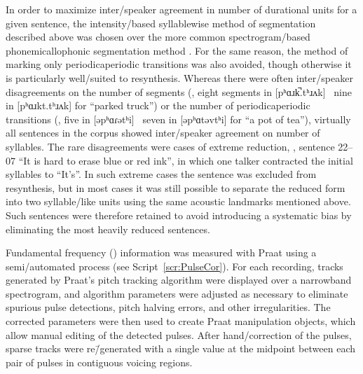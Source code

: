 In order to maximize inter\-/speaker agreement in number of durational units for a given sentence, the intensity\-/based syllablewise method of segmentation described above was chosen over the more common spectrogram\-/based phonemic\slsh allophonic segmentation method \citep[\eg][]{PetersonLehiste1960, TurkEtAl2006}.  For the same reason, the method of marking only periodic\slsh aperiodic transitions was also avoided, though otherwise it is particularly well\-/suited to \psola{} resynthesis.  Whereas there were often inter\-/speaker disagreements on the number of segments (\eg, eight segments in [pʰɑɹk̚.tʰɹʌk] \vs\ nine in [pʰɑɹkt.tʰɹʌk] for “parked truck”) or the number of periodic\slsh aperiodic transitions (\eg, five in [əpʰɑɾətʰi] \vs\ seven in [əpʰɑtəvtʰi] for “a pot of tea”), virtually all sentences in the corpus showed inter\-/speaker agreement on number of syllables.  The rare disagreements were cases of extreme reduction, \eg, sentence 22–07 “It is hard to erase blue or red ink”, in which one talker contracted the initial syllables to “It’s”.  In such extreme cases the sentence was excluded from resynthesis, but in most cases it was still possible to separate the reduced form into two syllable\-/like units using the same acoustic landmarks mentioned above.  Such sentences were therefore retained to avoid introducing a systematic bias by eliminating the most heavily reduced sentences.

Fundamental frequency (\fo) information was measured with Praat using a semi\-/automated process (see Script~\ref{scr:PulseCor}).  For each recording, \fo{} tracks generated by Praat’s pitch tracking algorithm were displayed over a narrowband spectrogram, and algorithm parameters were adjusted as necessary to eliminate spurious pulse detections, pitch halving errors, and other irregularities.  The corrected parameters were then used to create Praat manipulation objects, which allow manual editing of the detected pulses.  After hand\-/correction of the pulses, sparse \fo{} tracks were re\=/generated with a single value at the midpoint between each pair of pulses in contiguous voicing regions.

